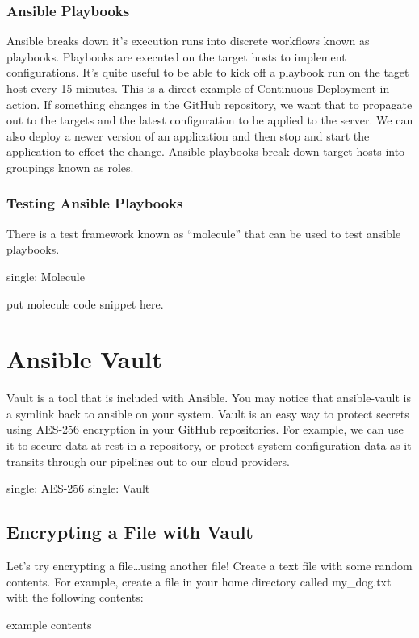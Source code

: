 \subsubsection{Ansible Playbooks}
\justify{}
Ansible breaks down it's execution runs into discrete workflows known as
playbooks. Playbooks are executed on the target hosts to implement
configurations. It's quite useful to be able to kick off a playbook run
on the taget host every 15 minutes. This is a direct example of
Continuous Deployment in action. If something changes in the GitHub
repository, we want that to propagate out to the targets and the latest
configuration to be applied to the server. We can also deploy a newer
version of an application and then stop and start the application to
effect the change.
\justify{}
Ansible playbooks break down target hosts into groupings known as roles.

\subsubsection{Testing Ansible Playbooks}
\justify{}
There is a test framework known as ``molecule'' that can be used to test
ansible playbooks.

single: Molecule

put molecule code snippet here.

\section{Ansible Vault}
\justify{}
Vault is a tool that is included with Ansible. You may notice that
ansible-vault is a symlink back to ansible on your system. Vault is an
easy way to protect secrets using AES-256 encryption in your GitHub
repositories. For example, we can use it to secure data at rest in a
repository, or protect system configuration data as it transits through
our pipelines out to our cloud providers.

single: AES-256 single: Vault

\subsection{Encrypting a File with Vault}

\justify{}
Let's try encrypting a file\ldots using another file! Create a text file
with some random contents. For example, create a file in your home
directory called my\_dog.txt with the following contents:

example contents

